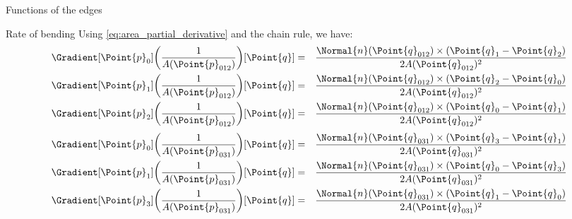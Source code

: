 \begin{plSection}{Functions of the edges}
\begin{plSection}{Rate of bending}
Using \cref{eq:area_partial_derivative}
and the chain rule, we have:
\begin{eqnarray}
\label{eq:inverse-area-gradient-012}
\Gradient[\Point{p}_0]
{\left( \frac{1}{A(\Point{p}_{012})} \right)}
[\Point{q}]
& = &
\frac{
\Normal{n}(\Point{q}_{012}) \times 
\left( \Point{q}_1 - \Point{q}_2 \right)
}
{2 A(\Point{q}_{012})^2 }
\\
\Gradient[\Point{p}_1]
{\left( \frac{1}{A(\Point{p}_{012})} \right)}
[\Point{q}]
& = &
\frac{
\Normal{n}(\Point{q}_{012}) \times
 \left( \Point{q}_2 - \Point{q}_0 \right)
 }
{2 A(\Point{q}_{012})^2 } 
\nonumber
\\
\Gradient[\Point{p}_2]
{\left( \frac{1}{A(\Point{p}_{012})} \right)}
[\Point{q}]
& = &
\frac{
\Normal{n}(\Point{q}_{012}) \times 
\left( \Point{q}_0 - \Point{q}_1 \right)
}
{2 A(\Point{q}_{012})^2 } 
\nonumber
\end{eqnarray}
\begin{eqnarray}
\label{eq:inverse-area-gradient-031}
\Gradient[\Point{p}_0]
{\left( \frac{1}{A(\Point{p}_{031})} \right)}
[\Point{q}]
& = &
\frac{
\Normal{n}(\Point{q}_{031}) \times
 \left( \Point{q}_3 - \Point{q}_1 \right)
 }
{2 A(\Point{q}_{031})^2 }
\\
\Gradient[\Point{p}_1]
{\left( \frac{1}{A(\Point{p}_{031})} \right)}
[\Point{q}]
& = &
\frac{
\Normal{n}(\Point{q}_{031}) \times 
\left( \Point{q}_0 - \Point{q}_3 \right)
}
{2 A(\Point{q}_{031})^2 }
\nonumber
\\
\Gradient[\Point{p}_3]
{\left( \frac{1}{A(\Point{p}_{031})} \right)}
[\Point{q}]
& = &
\frac{
\Normal{n}(\Point{q}_{031}) \times 
\left( \Point{q}_1 - \Point{q}_0 \right)
}
{2 A(\Point{q}_{031})^2 }
\nonumber
\end{eqnarray}

\end{plSection}%
\end{plSection}%
